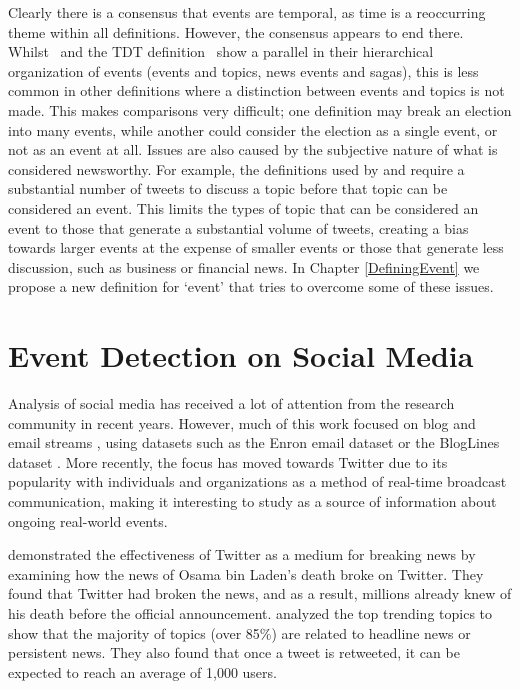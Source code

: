 Clearly there is a consensus that events are temporal, as time is a reoccurring theme within all definitions.
However, the consensus appears to end there.
Whilst~\cite{Aggarwal12} and the TDT definition~\citep{Allan:2002:ITD:772260.772262} show a parallel in their hierarchical organization of events (events and topics, news events and sagas), this is less common in other definitions where a distinction between events and topics is not made.
This makes comparisons very difficult; one definition may break an election into many events, while another could consider the election as a single event, or not as an event at all.
Issues are also caused by the subjective nature of what is considered newsworthy.
For example, the definitions used by \cite{weng2011event} and \cite{Becker_beyondtrending} require a substantial number of tweets to discuss a topic before that topic can be considered an event.
This limits the types of topic that can be considered an event to those that generate a substantial volume of tweets, creating a bias towards larger events at the expense of smaller events or those that generate less discussion, such as business or financial news. In Chapter \ref{DefiningEvent} we propose a new definition for `event' that tries to overcome some of these issues.

\section{Event Detection on Social Media}

Analysis of social media has received a lot of attention from the research community in recent years.
However, much of this work focused on blog and email streams  \citep{Zhao:2007:TIF:1619797.1619886,Jurgens:2009:EDB:1859650.1859652,Becker:2010:LSM:1718487.1718524,Nguyen:2011:ERR:2186701.2186707}, using datasets such as the Enron email dataset \citep{citeulike:7616867} or the BlogLines dataset \citep{Sia:2008:ECP:1401890.1401967}.
More recently, the focus has moved towards Twitter due to its popularity with individuals and organizations as a method of real-time broadcast communication, making it interesting to study as a source of information about ongoing real-world events.

\cite{Hu:2012:BNT:2208636.2208672} demonstrated the effectiveness of Twitter as a medium for breaking news by examining how the news of Osama bin Laden's death broke on Twitter.
They found that Twitter had broken the news, and as a result, millions already knew of his death before the official announcement.
\cite{Kwak:2010:TSN:1772690.1772751} analyzed the top trending topics to show that the majority of topics (over 85\%) are related to headline news or persistent news.
They also found that once a tweet is retweeted, it can be expected to reach an average of 1,000 users.

